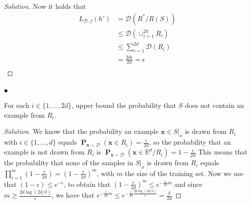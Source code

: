 \documentclass[10pt, a4paper, twoside]{amsart}
\newcommand{\R}{\ensuremath{\mathbb{R}}}
\renewcommand{\P}{\operatorname*{\ensuremath{\mathbf{P}}}}
\newenvironment{solution}
               {\let\oldqedsymbol=\qedsymbol
                \renewcommand{\qedsymbol}{$\blacktriangleleft$}
                \begin{proof}[Solution]}
               {\end{proof}
                \renewcommand{\qedsymbol}{\oldqedsymbol}}
\begin{document}
\begin{solution}

Now it holds that
\begin{align*}
  L_{\mathcal{D},f}(h') & = \mathcal{D}(R^*/R(S)) \\
                      & \leq \mathcal{D}(\cup_{i=1}^{2d} R_i) \\
                      & \leq \sum_{i=1}^{2d} \mathcal{D}(R_i)\\
 & = \frac{2d\epsilon}{2d} = \epsilon \\
\end{align*}
\end{solution}
\subsubsection*{$\bullet$}
For each $i \in \{1,\ldots,2d\}$, upper bound the probability that $S$ does not contain an example from $R_i$.\\
\begin{solution}
  We know that the probability an example $\mathbf{x} \in S|_x$ is drawn from $R_i$ with $i \in \{1,\ldots, d\}$ equals $\P_{\mathbf{x}\sim\mathcal{D}}(\mathbf{x}\in R_i) = \frac{\epsilon}{2d}$, so the probability that an example is not drawn from $R_i$ is $\P_{\mathbf{x}\sim\mathcal{D}}(\mathbf{x}\in \R^d/R_i) = 1-\frac{\epsilon}{2d}$ This means that the probability that none of the samples in $S|_x$ is drawn from $R_i$ equals $\prod_{i = 1}^m(1-\frac{\epsilon}{2d}) = (1-\frac{\epsilon}{2d})^m$, with $m$ the size of the training set. Now we use that $(1-\epsilon)\leq e^{-\epsilon}$, to obtain that $(1-\frac{\epsilon}{2d})^m \leq e^{- \frac{\epsilon}{2d}m}$ and since $m \geq \frac{2d\log (2d/\delta)}{\epsilon}$, we have that $e^{- \frac{\epsilon}{2d}m} \leq e^{-\frac{\epsilon}{2d}\frac{2d\log (2d/\delta)}{\epsilon}}= \frac{\delta}{2d}$
\end{solution}
\end{document}
